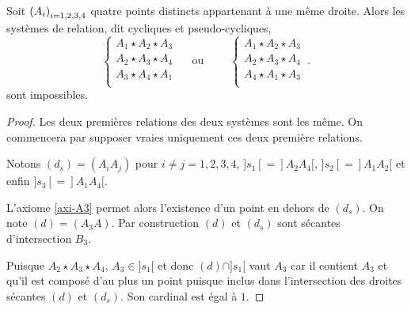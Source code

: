 
\begin{lem}\label{lem-Impossibilitecyclique}
    Soit $\left(A_{i}\right)_{i = 1,2,3,4}$ quatre points distincts appartenant à une même droite. Alors les systèmes de relation, dit cycliques et pseudo-cycliques,
        \begin{equation*}
        \left\{
            \begin{array}{c}
                 A_{1} \star A_{2} \star A_{3} \\
                 A_{2} \star A_{3} \star A_{4}\\
                 A_{3} \star A_{4} \star A_{1}\\
            \end{array}
            \right. 
             \quad\text{ ou }\qquad \left\{
            \begin{array}{c}
                 A_{1} \star A_{2} \star A_{3} \\
                 A_{2} \star A_{3} \star A_{4}\\
                 A_{4} \star A_{1} \star A_{3}\\
            \end{array}
            \right.
            \,.
    \end{equation*}
    sont impossibles. 
    \begin{proof}
        Les deux premières relations des deux systèmes sont les même. On commencera par supposer vraies uniquement ces deux première relations.
    
        Notons $(d_s)=(A_i A_j)$ pour $i\neq j = 1,2,3,4$, $]s_1[=]A_2 A_4[$, $]s_2[=]A_1 A_2[$ et enfin $]s_3[=]A_1 A_4[$. 

        L'axiome \ref{axi-A3} permet alors l'existence d'un point en dehors de $(d_s)$. On note $(d)=(A_3 A)$.  Par construction $(d)$ et $(d_s)$ sont sécantes d'intersection $B_3$.

        Puisque $A_{2} \star A_{3} \star A_{4}$, $A_3\in ]s_1[$ et donc $(d)\cap ]s_1[$ vaut $A_3$ car il contient $A_3$ et qu'il est composé d'au plus un point puisque inclus dans l'intersection des droites sécantes $(d)$ et $(d_s)$. Son cardinal est égal à $1$.


\end{proof}
\end{lem}
